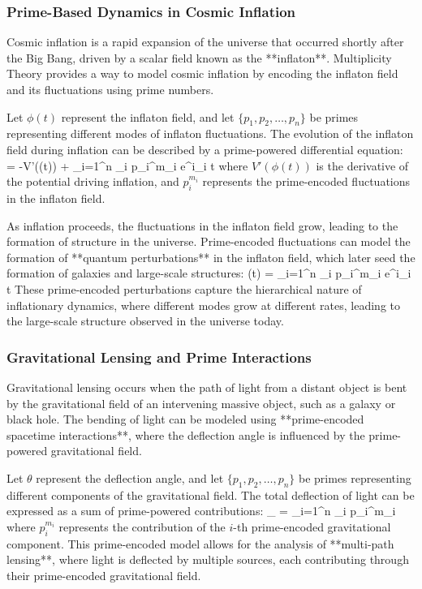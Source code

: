 \documentclass[12pt]{article}
\begin{document}
\subsubsection{Prime-Based Dynamics in Cosmic Inflation}

Cosmic inflation is a rapid expansion of the universe that occurred shortly after the Big Bang, driven by a scalar field known as the **inflaton**. Multiplicity Theory provides a way to model cosmic inflation by encoding the inflaton field and its fluctuations using prime numbers.

Let \( \phi(t) \) represent the inflaton field, and let \( \{p_1, p_2, \dots, p_n\} \) be primes representing different modes of inflaton fluctuations. The evolution of the inflaton field during inflation can be described by a prime-powered differential equation:
\]
 = -V'(\phi(t)) + \sum_{i=1}^{n} \beta_i p_i^{m_i} e^{i\omega_i t}
\]
where \( V'(\phi(t)) \) is the derivative of the potential driving inflation, and \( p_i^{m_i} \) represents the prime-encoded fluctuations in the inflaton field.

As inflation proceeds, the fluctuations in the inflaton field grow, leading to the formation of structure in the universe. Prime-encoded fluctuations can model the formation of **quantum perturbations** in the inflaton field, which later seed the formation of galaxies and large-scale structures:
\]
\delta \phi(t) = \sum_{i=1}^{n} \alpha_i p_i^{m_i} e^{i\omega_i t}
\]
These prime-encoded perturbations capture the hierarchical nature of inflationary dynamics, where different modes grow at different rates, leading to the large-scale structure observed in the universe today.

\subsubsection{Gravitational Lensing and Prime Interactions}

Gravitational lensing occurs when the path of light from a distant object is bent by the gravitational field of an intervening massive object, such as a galaxy or black hole. The bending of light can be modeled using **prime-encoded spacetime interactions**, where the deflection angle is influenced by the prime-powered gravitational field.

Let \( \theta \) represent the deflection angle, and let \( \{p_1, p_2, \dots, p_n\} \) be primes representing different components of the gravitational field. The total deflection of light can be expressed as a sum of prime-powered contributions:
\]
\theta_{} = \sum_{i=1}^{n} \alpha_i p_i^{m_i}
\]
where \( p_i^{m_i} \) represents the contribution of the \( i \)-th prime-encoded gravitational component. This prime-encoded model allows for the analysis of **multi-path lensing**, where light is deflected by multiple sources, each contributing through their prime-encoded gravitational field.
\end{document}
